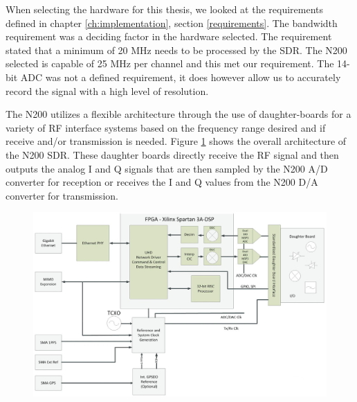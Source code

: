 When selecting the hardware for this thesis, we looked at the requirements defined in chapter \ref{ch:implementation}, section \ref{requirements}.  The bandwidth requirement was a deciding factor in the hardware selected.  The requirement stated that a minimum of 20 MHz needs to be processed by the SDR.  The N200 selected is capable of 25 MHz per channel and this met our requirement.  The 14-bit ADC was not a defined requirement, it does however allow us to accurately record the signal with a high level of resolution.  

The N200 utilizes a flexible architecture through the use of daughter-boards for a variety of RF interface systems based on the frequency range desired and if receive and/or transmission is needed.  Figure \ref{N200_block} shows the overall architecture of the N200 SDR.  These daughter boards directly receive the RF signal and then outputs the analog I and Q signals that are then sampled by the N200 A/D converter for reception or receives the I and Q values from the N200 D/A converter for transmission. 

{\begin{figure}[h!tb] 
\centering
\includegraphics[width=14cm]{Images/n200_block_edited}
\label{N200_block}
\end{figure}
}


